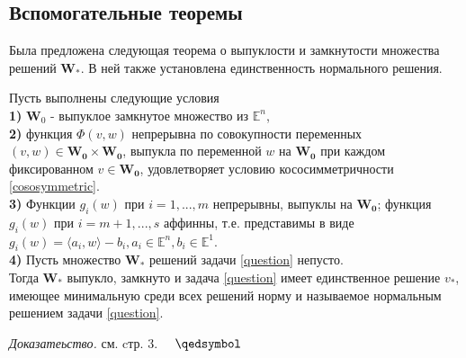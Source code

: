 \subsection{Вспомогательные теоремы}
Была предложена следующая теорема о выпуклости и замкнутости множества решений $\mathbf{W_{*}}$. В ней также установлена единственность нормального решения. 
\begin{theo}
	\label{thero-2-1}
	Пусть выполнены следующие условия\\
	\textbf{1)} $\mathbf{W}_0$ - выпуклое замкнутое множество из $\mathbb{E}^n$,\\
	\textbf{2)} функция $\Phi(v,w)$ непрерывна по совокупности переменных $(v,w)\in\mathbf{W_0}\times\mathbf{W_0}$, выпукла по переменной $w$ на $\mathbf{W_0}$ при каждом фиксированном $v\in\mathbf{W_0}$, удовлетворяет условию кососимметричности \eqref{cososymmetric}. \\
	\textbf{3)} Функции $g_i(w)$ при $i=1,...,m$ непрерывны, выпуклы на $\mathbf{W_0}$; функция $g_i(w)$ при $i=m+1,...,s$ аффинны, т.е. представимы в виде $g_i(w)=\langle a_i,w \rangle-b_i,a_i\in\mathbb{E}^n,b_i\in\mathbb{E}^1$. \\
	\textbf{4)} Пусть множество $\mathbf{W_*}$ решений задачи \eqref{question} непусто. \\
	Тогда $\mathbf{W_*}$ выпукло, замкнуто и задача \eqref{question} имеет единственное решение $v_*$, имеющее минимальную среди всех решений норму и называемое нормальным решением задачи \eqref{question}.
\end{theo}
\noindent\emph{Доказатеьство.} см. \cite{centralbib-2} cтр. 3. $\quad\qedsymbol$

